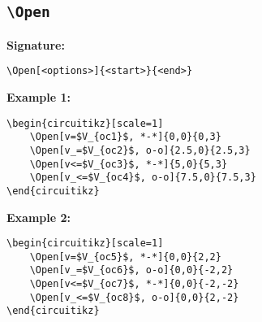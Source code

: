 \documentclass[a4paper,12pt]{article}
\begin{document}
\begin{center}
\begin{circuitikz}[scale=1]
\end{circuitikz}
\end{center}

\subsection{\texttt{\textbackslash Open}}

\textbf{Signature:}
\begin{verbatim}
\Open[<options>]{<start>}{<end>}
\end{verbatim}

\textbf{Example 1:}

\begin{lstlisting}[style=latexstyle]
\begin{circuitikz}[scale=1]
	\Open[v=$V_{oc1}$, *-*]{0,0}{0,3}
	\Open[v_=$V_{oc2}$, o-o]{2.5,0}{2.5,3}
	\Open[v<=$V_{oc3}$, *-*]{5,0}{5,3}
	\Open[v_<=$V_{oc4}$, o-o]{7.5,0}{7.5,3}
\end{circuitikz}
\end{lstlisting}


\begin{center}
\begin{circuitikz}[scale=1]
\end{circuitikz}
\end{center}

\textbf{Example 2:}

\begin{lstlisting}[style=latexstyle]
\begin{circuitikz}[scale=1]
	\Open[v=$V_{oc5}$, *-*]{0,0}{2,2}
	\Open[v_=$V_{oc6}$, o-o]{0,0}{-2,2}
	\Open[v<=$V_{oc7}$, *-*]{0,0}{-2,-2}
	\Open[v_<=$V_{oc8}$, o-o]{0,0}{2,-2}
\end{circuitikz}
\end{lstlisting}

\begin{center}
\begin{circuitikz}[scale=1]
\end{circuitikz}
\end{center}
\end{document}
